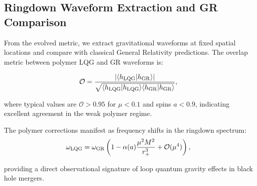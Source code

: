 \documentclass[11pt]{article}
\begin{document}
\subsection{Ringdown Waveform Extraction and GR Comparison}

From the evolved metric, we extract gravitational waveforms at fixed spatial locations and compare with classical General Relativity predictions. The overlap metric between polymer LQG and GR waveforms is:

\begin{equation}
\mathcal{O} = \frac{|\langle h_{\rm LQG}|h_{\rm GR}\rangle|}{\sqrt{\langle h_{\rm LQG}|h_{\rm LQG}\rangle\langle h_{\rm GR}|h_{\rm GR}\rangle}},
\end{equation}

where typical values are $\mathcal{O} > 0.95$ for $\mu < 0.1$ and spins $a < 0.9$, indicating excellent agreement in the weak polymer regime.

The polymer corrections manifest as frequency shifts in the ringdown spectrum:
\begin{equation}
\omega_{\rm LQG} = \omega_{\rm GR}\left(1 - \alpha(a)\frac{\mu^2 M^2}{r_+^3} + \mathcal{O}(\mu^4)\right),
\end{equation}

providing a direct observational signature of loop quantum gravity effects in black hole mergers.
\end{document}
